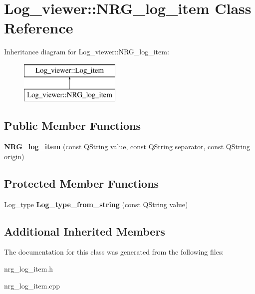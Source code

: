 \hypertarget{class_log__viewer_1_1_n_r_g__log__item}{\section{Log\-\_\-viewer\-:\-:N\-R\-G\-\_\-log\-\_\-item Class Reference}
\label{class_log__viewer_1_1_n_r_g__log__item}
}
Inheritance diagram for Log\-\_\-viewer\-:\-:N\-R\-G\-\_\-log\-\_\-item\-:\begin{figure}[H]
\begin{center}
\leavevmode
\includegraphics[height=2.000000cm]{class_log__viewer_1_1_n_r_g__log__item}
\end{center}
\end{figure}
\subsection*{Public Member Functions}
\begin{DoxyCompactItemize}
\item 
\hypertarget{class_log__viewer_1_1_n_r_g__log__item_ad0e0673aaa3ef377a481d25d3d5e1ebe}{{\bfseries N\-R\-G\-\_\-log\-\_\-item} (const Q\-String value, const Q\-String separator, const Q\-String origin)}\label{class_log__viewer_1_1_n_r_g__log__item_ad0e0673aaa3ef377a481d25d3d5e1ebe}

\end{DoxyCompactItemize}
\subsection*{Protected Member Functions}
\begin{DoxyCompactItemize}
\item 
\hypertarget{class_log__viewer_1_1_n_r_g__log__item_a65ef836ae997a66077782c95a365260b}{Log\-\_\-type {\bfseries Log\-\_\-type\-\_\-from\-\_\-string} (const Q\-String value)}\label{class_log__viewer_1_1_n_r_g__log__item_a65ef836ae997a66077782c95a365260b}

\end{DoxyCompactItemize}
\subsection*{Additional Inherited Members}


The documentation for this class was generated from the following files\-:\begin{DoxyCompactItemize}
\item 
nrg\-\_\-log\-\_\-item.\-h\item 
nrg\-\_\-log\-\_\-item.\-cpp\end{DoxyCompactItemize}
